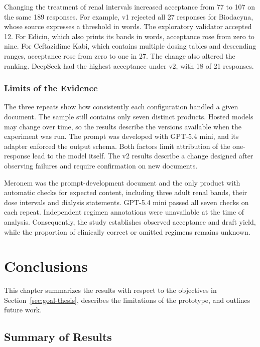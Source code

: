 \documentclass[12pt,a4paper,twoside]{book}
\begin{document}
Changing the treatment of renal intervals increased acceptance from 77 to 107 on the same 189 responses.
For example, v1 rejected all 27 responses for Biodacyna, whose source expresses a threshold in words. The exploratory validator accepted 12.
For Edicin, which also prints its bands in words, acceptance rose from zero to nine.
For Ceftazidime Kabi, which contains multiple dosing tables and descending ranges, acceptance rose from zero to one in 27.
The change also altered the ranking. DeepSeek had the highest acceptance under v2, with 18 of 21 responses.

\subsection{Limits of the Evidence}
\label{ssec:extraction-limitations}

The three repeats show how consistently each configuration handled a given document. The sample still contains only seven distinct products.
Hosted models may change over time, so the results describe the versions available when the experiment was run.
The prompt was developed with GPT-5.4 mini, and its adapter enforced the output schema.
Both factors limit attribution of the one-response lead to the model itself.
The v2 results describe a change designed after observing failures and require confirmation on new documents.

Meronem was the prompt-development document and the only product with automatic checks for expected content, including three adult renal bands, their dose intervals and dialysis statements.
GPT-5.4 mini passed all seven checks on each repeat.
Independent regimen annotations were unavailable at the time of analysis.
Consequently, the study establishes observed acceptance and draft yield, while the proportion of clinically correct or omitted regimens remains unknown.

\chapter{Conclusions}\label{ch:conclusions}

This chapter summarizes the results with respect to the objectives in Section~\ref{sec:goal-thesis}, describes the limitations of the prototype, and outlines future work.

\section{Summary of Results}\label{sec:summary-results}
\end{document}
